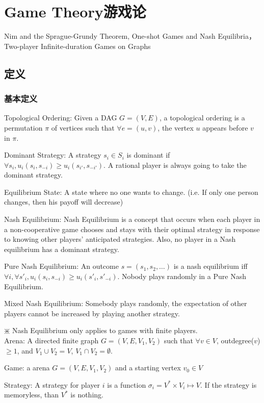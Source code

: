 \documentclass[12pt,a4paper]{ctexrep}
\begin{document}
\fi

\chapter{Game Theory游戏论}
Nim and the Sprague-Grundy Theorem, One-shot Games and Nash Equilibria， Two-player Infinite-duration Games on Graphs
\section{定义}
\subsection{基本定义}
Topological Ordering: Given a DAG $G = (V,E)$, a topological ordering is a permutation $\pi$ of vertices such that $\forall e = (u,v)$, the vertex $u$ appears before $v$ in $\pi$.

Dominant Strategy: A strategy $s_i \in S_i$ is dominant if $\forall s_i, u_i(s_i,s_{-i}) \geqslant u_i(s_{i'},s_{-i'})$. A rational player is always going to take the dominant strategy.

Equilibrium State: A state where no one wants to change. (i.e. If only one person changes, then his payoff will decrease)

Nash Equilibrium: Nash Equilibrium is a concept that occurs when each player in a non-cooperative game chooses and stays with their optimal strategy in response to knowing other players' anticipated strategies. Also, no player in a Nash equilibrium has a dominant strategy.

Pure Nash Equilibrium: An outcome $s = (s_1,s_2,\dots)$ is a nash equilibrium iff $\forall i, \forall s'_i, u_i(s_i,s_{-i}) \geqslant u_i(s'_i,s'_{-i})$. Nobody plays randomly in a Pure Nash Equilibrium.

Mixed Nash Equilibrium: Somebody plays randomly, the expectation of other players cannot be increased by playing another strategy.

$\divideontimes$ Nash Equilibrium only applies to games with finite players.\\

Arena: A directed finite graph $G = (V,E,V_1,V_2)$ such that $\forall v \in V$, outdegree($v$)$\geqslant 1$, and $V_1 \cup V_2 = V$, $V_1 \cap V_2 = \emptyset$.

Game: a arena $G = (V,E,V_1,V_2)$ and a starting vertex $v_0\in V$

Strategy: A strategy for player $i$ is a function $\sigma_i = V^* \times V_i \mapsto V$. If the strategy is memoryless, than $V^*$ is  nothing.
\end{document}

